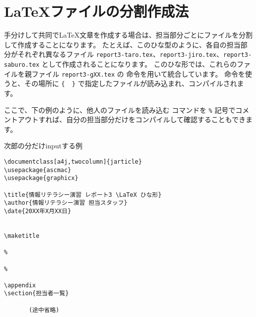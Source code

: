 \section{\LaTeX ファイルの分割作成法}
手分けして共同で\LaTeX 文章を作成する場合は、担当部分ごとにファイルを分割して作成することになります。
たとえば、このひな型のように、各自の担当部分がそれぞれ異なるファイル \verb+report3-taro.tex+、\verb+report3-jiro.tex+、\verb+report3-saburo.tex+ として作成されることになります。
このひな形では、これらのファイルを親ファイル \verb+report3-gXX.tex+ の \verb++ 命令を用いて統合しています。
\verb++ 命令を使うと、その場所に \verb+{  }+ で指定したファイルが読み込まれ、コンパイルされます。

ここで、下の例のように、他人のファイルを読み込む \verb++コマンドを \verb+%+ 記号でコメントアウトすれば、自分の担当部分だけをコンパイルして確認することもできます。

\small
\begin{itembox}{次郎の分だけinputする例}
\begin{verbatim}
\documentclass[a4j,twocolumn]{jarticle}
\usepackage{ascmac}
\usepackage{graphicx}

\title{情報リテラシー演習 レポート3 \LaTeX ひな形}
\author{情報リテラシー演習 担当スタッフ}
\date{20XX年X月XX日}


\maketitle

%

%

\appendix
\section{担当者一覧}

       (途中省略)


\end{verbatim}
\end{itembox}
\normalsize
